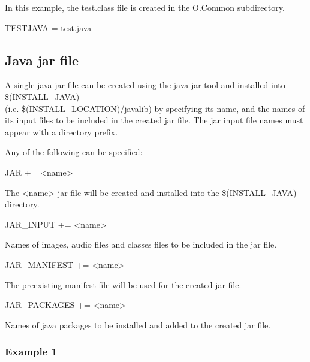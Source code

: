 In this example, the test.class file is created in the O.Common subdirectory.

\begin{description}

\item {}TESTJAVA = test.java

\end{description}

\subsection{Java jar file}

A single java jar file can be created using the java jar tool and installed into \$(INSTALL\_JAVA) \\
(i.e. \$(INSTALL\_LOCATION)/javalib) by specifying its name, and the names of its input files to be included in the created jar 
file. The jar input file names must appear with a directory prefix.

Any of the following can be specified:

\begin{description}

\item {}JAR += \textless{}name\textgreater{}

The \textless{}name\textgreater{} jar file will be created and installed into the \$(INSTALL\_JAVA) directory.

\item {}JAR\_INPUT += \textless{}name\textgreater{}

Names of images, audio files and classes files to be included in the jar file.

\item {}JAR\_MANIFEST += \textless{}name\textgreater{}

The preexisting manifest file will be used for the created jar file.

\item JAR\_PACKAGES += \textless{}name\textgreater{}

Names of java packages to be installed and added to the created jar file.

\end{description}

\subsubsection{Example 1}

